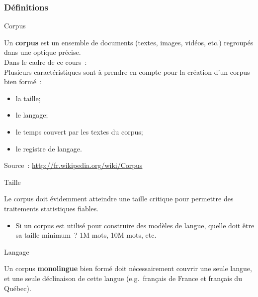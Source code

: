 \begin{frame}[allowframebreaks]
\frametitle{Définitions}

\begin{block}{Corpus}

Un \textbf{corpus} est un ensemble de documents (textes, images, vidéos, etc.) 
regroupés dans une optique précise.\\[0.5em]

Dans le cadre de ce cours~: \alert{}\\[0.5em]

Plusieurs caractéristiques sont à prendre en compte pour la création d'un corpus
bien formé~:

	\begin{itemize}
		\item la taille;
		\item le langage;
		\item le temps couvert par les textes du corpus;
		\item le registre de langage.
	\end{itemize}

\end{block}

Source~: \url{http://fr.wikipedia.org/wiki/Corpus}

\framebreak

\begin{block}{Taille}

Le corpus doit évidemment atteindre une taille critique pour permettre des 
traitements statistiques fiables.

    \begin{itemize}
        \item Si un corpus est utilisé pour construire des modèles de langue, 
              quelle doit être sa taille minimum~? 1M mots, 10M mots, etc.
    \end{itemize}

\end{block}

\begin{block}{Langage}

Un corpus \textbf{monolingue} bien formé doit nécessairement couvrir une seule 
langue, et une seule déclinaison de cette langue (e.g.~français de France et 
français du Québec).

\end{block}


\end{frame}
